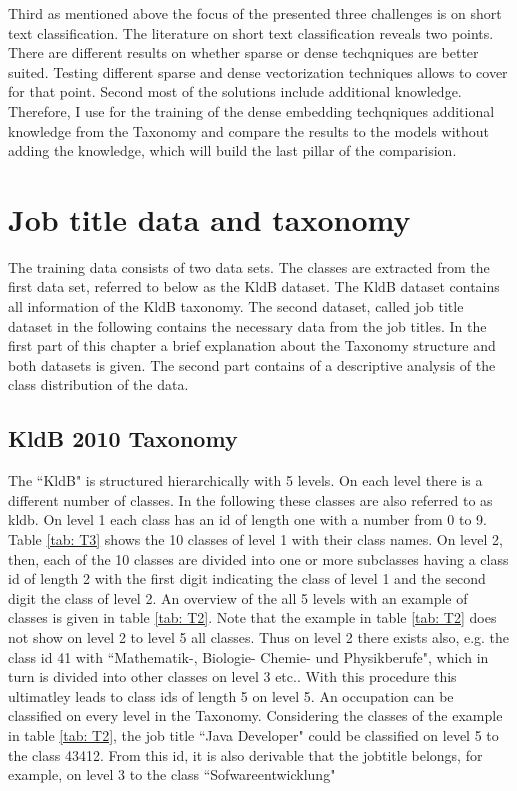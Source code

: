 \documentclass[12pt, a4paper, titlepage]{article}
\begin{document}
Third as mentioned above the focus of the presented three challenges is on short text classification. The literature on short text classification reveals two points. There are different results on whether sparse or dense techqniques are better suited. Testing different sparse and dense vectorization techniques allows to cover for that point. Second most of the solutions include additional knowledge. Therefore, I use for the training of the dense embedding techqniques additional knowledge from the Taxonomy and compare the results to the models without adding the knowledge, which will build the last pillar of the comparision. 


\section{Job title data and taxonomy}
The training data consists of two data sets. The classes are extracted from the first data set, referred to below as the \ac{KldB} dataset. The \ac{KldB} dataset contains all information of the \ac{KldB} taxonomy. The second dataset, called job title dataset in the following contains the necessary data from the job titles. In the first part of this chapter a brief explanation about the Taxonomy structure and both datasets is given. The second part contains of a descriptive analysis of the class distribution of the data. 

\subsection{KldB 2010 Taxonomy}
The ``\ac{KldB}" is structured hierarchically with 5 levels. On each level there is a different number of classes. In the following these classes are also referred to as kldb. On level 1 each class has an id of length one with a number from 0 to 9. Table \ref{tab: T3} shows the 10 classes of level 1 with their class names. On level 2, then, each of the 10 classes are divided into one or more subclasses having a class id of length 2 with the first digit indicating the class of level 1 and the second digit the class of level 2. An overview of the all 5 levels with an example of classes is given in table \ref{tab: T2}. Note that the example in table \ref{tab: T2} does not show on level 2 to level 5 all classes. Thus on level 2 there exists also, e.g. the class id 41 with ``Mathematik-, Biologie- Chemie- und Physikberufe", which in turn is divided into other classes on level 3 etc..  With this procedure this ultimatley leads to class ids of length 5 on level 5. An occupation can be classified on every level in the Taxonomy. Considering the classes of the example in table \ref{tab: T2}, the job title ``Java Developer" could  be classified on level 5 to the class 43412. From this id, it is also derivable that the jobtitle belongs, for example, on level 3 to the class ``Sofwareentwicklung" \citep{Bundesagentur2011a, Bundesagentur2011b, Paulus2013}
\end{document}
